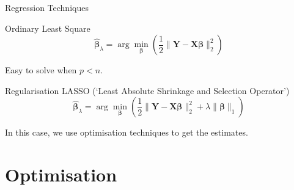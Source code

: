 \documentclass[tikz]{beamer}					%
\newcommand{\bbeta}{\bm{\beta}}
\newcommand{\hb}{\hat{\bbeta}}
\begin{document}
{
\begin{frame}{Regression Techniques}
\begin{block}{Ordinary Least Square}
    \begin{equation}
	\hb_{\lambda} = \arg\min_{\bbeta} \left(\frac{1}{2}\|\bm{Y}-\bm{X}\bbeta\|_2^2\right)
	\end{equation}
\end{block}
Easy to solve when $p<n$.
\begin{block}{Regularisation}
    LASSO (`Least Absolute Shrinkage and Selection Operator')
    \begin{equation}
	\hb_{\lambda} = \arg\min_{\bbeta} \left(\frac{1}{2}\|\bm{Y}-\bm{X}\bbeta\|_2^2 +\lambda \|\bbeta\|_1 \right)
	\end{equation}
\end{block}
In this case, we use optimisation techniques to get the estimates.
\end{frame}
}

\section{Optimisation}
\end{document}
